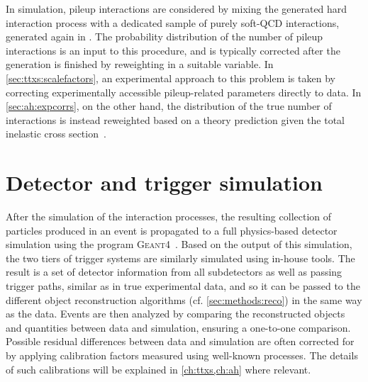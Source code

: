 In simulation, pileup interactions are considered by mixing the generated hard interaction process with a dedicated sample of purely soft-QCD interactions, generated again in \pythia. The probability distribution of the number of pileup interactions is an input to this procedure, and is typically corrected after the generation is finished by reweighting in a suitable variable. In \cref{sec:ttxs:scalefactors}, an experimental approach to this problem is taken by correcting experimentally accessible pileup-related parameters directly to data. In \cref{sec:ah:expcorrs}, on the other hand, the distribution of the true number of interactions is instead reweighted based on a theory prediction given the total inelastic cross section~\cite{CMS:LUM-17-003}.

\section{Detector and trigger simulation}
\label{sec:mc:detector}

After the simulation of the interaction processes, the resulting collection of particles produced in an event is propagated to a full physics-based detector simulation using the program \textsc{Geant4}~\cite{GEANT4:2002}. Based on the output of this simulation, the two tiers of trigger systems are similarly simulated using in-house tools. The result is a set of detector information from all subdetectors as well as passing trigger paths, similar as in true experimental data, and so it can be passed to the different object reconstruction algorithms (cf. \cref{sec:methods:reco}) in the same way as the data. Events are then analyzed by comparing the reconstructed objects and quantities between data and simulation, ensuring a one-to-one comparison. Possible residual differences between data and simulation are often corrected for by applying calibration factors measured using well-known processes. The details of such calibrations will be explained in \cref{ch:ttxs,ch:ah} where relevant.